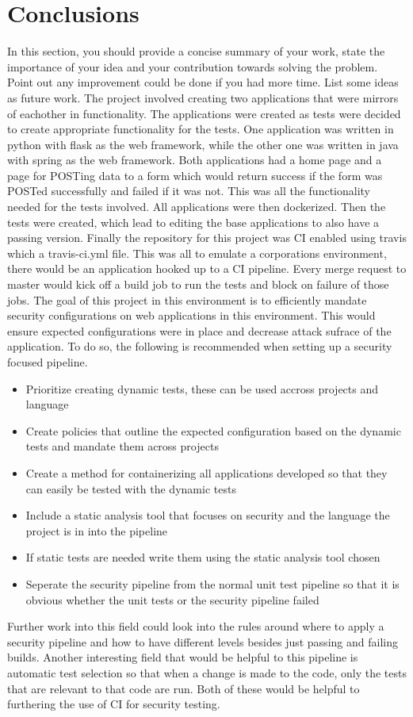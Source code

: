\section{Conclusions}
In this section, you should provide a concise summary of your work, state the importance of your idea and your contribution towards solving the problem. Point out any improvement could be done  if you had more time. List some ideas as future work. 
The project involved creating two applications that were mirrors of eachother in functionality. The applications were created as tests were decided to create appropriate functionality for the tests.
One application was written in python with flask as the web framework, while the other one was written in java with spring as the web framework. Both applications had a home page and a page for
POSTing data to a form which would return success if the form was POSTed successfully and failed if it was not. This was all the functionality needed for the tests involved.
All applications were then dockerized. Then the tests were created, which lead to editing the base applications to also have a passing version. Finally the repository for this project was CI enabled
using travis which a travis-ci.yml file.
This was all to emulate a corporations environment, there would be an application hooked up to a CI pipeline. Every merge request to master would kick off a build job to run the tests and block on
failure of those jobs. The goal of this project in this environment is to efficiently mandate security configurations on web applications in this environment. This would ensure expected configurations
were in place and decrease attack sufrace of the application. To do so, the following is recommended when setting up a security focused pipeline.
\begin{itemize}
    \item Prioritize creating dynamic tests, these can be used accross projects and language
    \item Create policies that outline the expected configuration based on the dynamic tests and mandate them across projects
    \item Create a method for containerizing all applications developed so that they can easily be tested with the dynamic tests
    \item Include a static analysis tool that focuses on security and the language the project is in into the pipeline
    \item If static tests are needed write them using the static analysis tool chosen
    \item Seperate the security pipeline from the normal unit test pipeline so that it is obvious whether the unit tests or the security pipeline failed 
\end{itemize}
Further work into this field could look into the rules around where to apply a security pipeline and how to have different levels besides just passing and failing builds. Another interesting field that
would be helpful to this pipeline is automatic test selection so that when a change is made to the code, only the tests that are relevant to that code are run. Both of these would be helpful to furthering
the use of CI for security testing.
